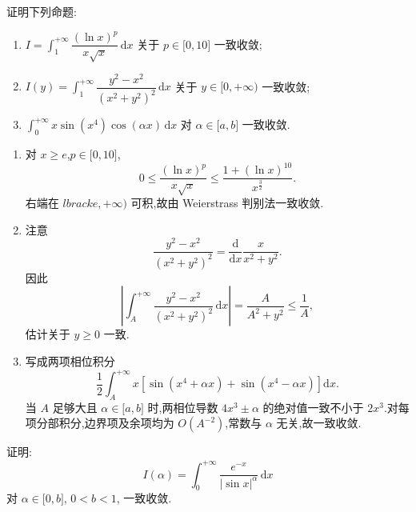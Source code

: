 \begin{example}
    证明下列命题:
    \begin{enumerate}
        \item $\displaystyle I=\int_1^{+\infty}\dfrac{(\ln x)^p}{x\sqrt{x}}\,\mathrm{d}x$ 关于 $p\in\lbrack0,10\rbrack$ 一致收敛;
        \item $\displaystyle I(y)=\int_1^{+\infty}\dfrac{y^2-x^2}{(x^2+y^2)^2}\,\mathrm{d}x$ 关于 $y\in\lbrack0,+\infty)$ 一致收敛;
        \item $\displaystyle \int_0^{+\infty}x\sin(x^4)\cos(\alpha x)\,\mathrm{d}x$ 对 $\alpha\in\lbrack a,b\rbrack$ 一致收敛.
    \end{enumerate}
\end{example}
\exampleblank

\begin{solution}
    \leavevmode
    \begin{enumerate}
        \item 对 $x\geq e$,$p\in\lbrack0,10\rbrack$,
              \[
                  0\leq\dfrac{(\ln x)^p}{x\sqrt x}
                  \leq\dfrac{1+(\ln x)^{10}}{x^{\frac{3}{2}}}.
              \]
              右端在 $lbrack e,+\infty)$ 可积,故由 Weierstrass 判别法一致收敛.
        \item 注意
              \[
                  \dfrac{y^2-x^2}{(x^2+y^2)^2}
                  =\dfrac{\mathrm{d}}{\mathrm{d}x}\dfrac{x}{x^2+y^2}.
              \]
              因此
              \[
                  \left|\int_A^{+\infty}\dfrac{y^2-x^2}{(x^2+y^2)^2}\,\mathrm{d}x\right|
                  =\dfrac{A}{A^2+y^2}\leq\dfrac{1}{A},
              \]
              估计关于 $y\geq0$ 一致.
        \item 写成两项相位积分
              \[
                  \dfrac{1}{2}\int_A^{+\infty}x
                  \left[\sin(x^4+\alpha x)+\sin(x^4-\alpha x)\right]\mathrm{d}x.
              \]
              当 $A$ 足够大且 $\alpha\in\lbrack a,b\rbrack$ 时,两相位导数
              $4x^3\pm\alpha$ 的绝对值一致不小于 $2x^3$.对每项分部积分,边界项及余项均为 $O(A^{-2})$,常数与 $\alpha$ 无关,故一致收敛.
    \end{enumerate}
\end{solution}

\begin{example}
    证明:
    \[
        I(\alpha)=\int_0^{+\infty}\dfrac{e^{-x}}{|\sin x|^\alpha}\,\mathrm{d}x
    \]
    对 $\alpha\in\lbrack0,b\rbrack$, $0<b<1$, 一致收敛.
\end{example}
\exampleblank

